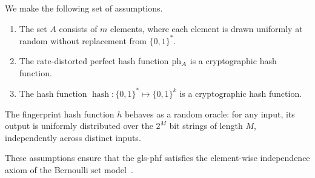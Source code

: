 \documentclass[ ../main.tex]{subfiles}
\begin{document}
We make the following set of assumptions.
\begin{enumerate}
    \item The set $A$ consists of $m$ elements, where each element is drawn uniformly at random without replacement from $\{0,1\}^*$.
    \item The rate-distorted perfect hash function $\operatorname{ph}_{A}$ is a cryptographic hash function.
    \item The hash function $\operatorname{hash} \colon \{0,1\}^* \mapsto \{0,1\}^k$ is a cryptographic hash function.
\end{enumerate}

\begin{assumption}
\label{asm:ro}
The fingerprint hash function $h$ behaves as a random oracle: for any input, its output is uniformly distributed over the $2^M$ bit strings of length $M$, independently across distinct inputs.
\end{assumption}

These assumptions ensure that the \gls{gls-phf} satisfies the element-wise independence axiom of the Bernoulli set model~\cite{bsets}.
\end{document}
